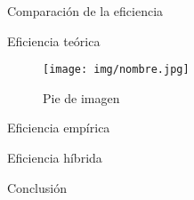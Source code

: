 \documentclass[12pt]{beamer}
\begin{document}
\begin{frame}{Comparación de la eficiencia}

\begin{block}{Eficiencia teórica}
\begin{figure}[H] 
\centering
\texttt{[image: img/nombre.jpg]} 
\caption{Pie de imagen} 
\label{etiqueta} 
\end{figure}
\end{block}

\begin{block}{Eficiencia empírica}

\end{block}

\begin{block}{Eficiencia híbrida}

\end{block}

\end{frame}

\begin{frame}{Conclusión}

\end{frame}
\end{document}
